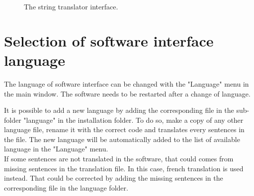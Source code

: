 \begin{figure}[h!]
\centering
{}
\caption{The string translator interface.}
\end{figure}


\section{Selection of software interface language}
The language of software interface can be changed with the "Language" menu in the main window. The software needs to be restarted after a change of language.

It is possible to add a new language by adding the corresponding file in the sub-folder "language" in the installation \tria folder. To do so, make a copy of any other language file, rename it with the correct code and translates every sentences in the file. The new language will be automatically added to the list of available language in the "Language" menu.\\

If some sentences are not translated in the software, that could comes from missing sentences in the translation file. In this case, french translation is used instead. That could be corrected by adding the missing sentences in the corresponding file in the language folder.\\


